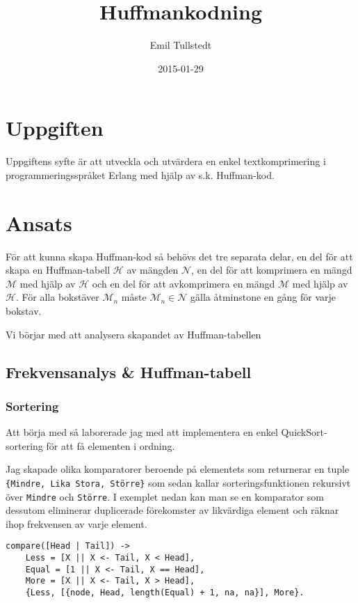\documentclass[a4paper, 11pt]{article}
\title{Huffmankodning}
\author{Emil Tullstedt}
\date{2015-01-29}
\begin{document}
\maketitle

\section{Uppgiften}

Uppgiftens syfte är att utveckla och utvärdera en enkel textkomprimering i programmeringsspråket Erlang med hjälp av s.k. Huffman-kod.

\section{Ansats}

För att kunna skapa Huffman-kod så behövs det tre separata delar, en del för att skapa en Huffman-tabell $\mathcal{H}$ av mängden $\mathcal{N}$, en del för att komprimera en mängd $\mathcal{M}$ med hjälp av $\mathcal{H}$ och en del för att avkomprimera en mängd $\mathcal{M}$ med hjälp av $\mathcal{H}$. För alla bokstäver $\mathcal{M}_n$ måste $\mathcal{M}_n \in \mathcal{N}$ gälla åtminstone en gång för varje bokstav.

Vi börjar med att analysera skapandet av Huffman-tabellen

\subsection{Frekvensanalys \& Huffman-tabell}

\subsubsection{Sortering}

Att börja med så laborerade jag med att implementera en enkel QuickSort-sortering för att få elementen i ordning.

Jag skapade olika komparatorer beroende på elementets som returnerar en tuple \texttt{\{Mindre, Lika Stora, Större\}} som sedan kallar sorteringsfunktionen rekursivt över \texttt{Mindre} och \texttt{Större}. I exemplet nedan kan man se en komparator som dessutom eliminerar duplicerade förekomster av likvärdiga element och räknar ihop frekvensen av varje element.

\begin{lstlisting}
compare([Head | Tail]) ->                                                          
    Less = [X || X <- Tail, X < Head],                                          
    Equal = [1 || X <- Tail, X == Head],                                           
    More = [X || X <- Tail, X > Head],                                           
    {Less, [{node, Head, length(Equal) + 1, na, na}], More}. 
\end{lstlisting}
\end{document}
